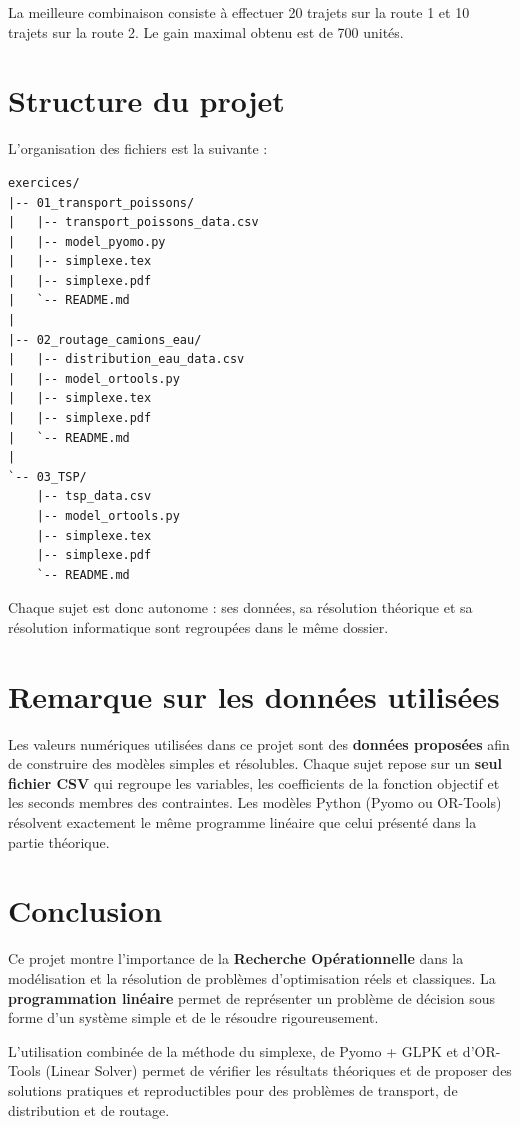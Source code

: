\documentclass[12pt,a4paper]{article}
\begin{document}
La meilleure combinaison consiste à effectuer 20 trajets sur la route 1 et 10 trajets sur la route 2. Le gain maximal obtenu est de 700 unités.

\section{Structure du projet}

L'organisation des fichiers est la suivante :

\begin{verbatim}
exercices/
|-- 01_transport_poissons/
|   |-- transport_poissons_data.csv
|   |-- model_pyomo.py
|   |-- simplexe.tex
|   |-- simplexe.pdf
|   `-- README.md
|
|-- 02_routage_camions_eau/
|   |-- distribution_eau_data.csv
|   |-- model_ortools.py
|   |-- simplexe.tex
|   |-- simplexe.pdf
|   `-- README.md
|
`-- 03_TSP/
    |-- tsp_data.csv
    |-- model_ortools.py
    |-- simplexe.tex
    |-- simplexe.pdf
    `-- README.md
\end{verbatim}

Chaque sujet est donc autonome : ses données, sa résolution théorique et sa résolution informatique sont regroupées dans le même dossier.

\section{Remarque sur les données utilisées}

Les valeurs numériques utilisées dans ce projet sont des \textbf{données proposées} afin de construire des modèles simples et résolubles. Chaque sujet repose sur un \textbf{seul fichier CSV} qui regroupe les variables, les coefficients de la fonction objectif et les seconds membres des contraintes. Les modèles Python (Pyomo ou OR-Tools) résolvent exactement le même programme linéaire que celui présenté dans la partie théorique.

\section{Conclusion}

Ce projet montre l'importance de la \textbf{Recherche Opérationnelle} dans la modélisation et la résolution de problèmes d'optimisation réels et classiques. La \textbf{programmation linéaire} permet de représenter un problème de décision sous forme d'un système simple et de le résoudre rigoureusement.

L'utilisation combinée de la méthode du simplexe, de Pyomo + GLPK et d'OR-Tools (Linear Solver) permet de vérifier les résultats théoriques et de proposer des solutions pratiques et reproductibles pour des problèmes de transport, de distribution et de routage.
\end{document}
